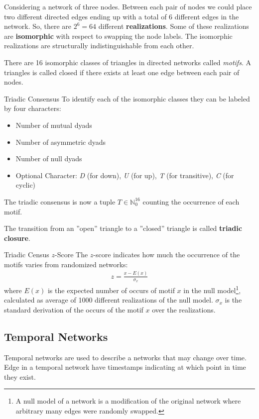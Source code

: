 \documentclass[english]{panikzettel}
\begin{document}
Considering a network of three nodes.
Between each pair of nodes we could place two different directed edges ending up with a total of 6 different edges in the network.
So, there are $ 2^6 = 64 $ different \textbf{realizations}.
Some of these realizations are \textbf{isomorphic} with respect to swapping the node labels.
The isomorphic realizations are structurally indistinguishable from each other.

There are 16 isomorphic classes of triangles in directed networks called \textit{motifs}.
A triangles is called closed if there exists at least one edge between each pair of nodes.

\begin{defi}{Triadic Consensus}
To identify each of the isomorphic classes they can be labeled by four characters:
\begin{itemize}
	\item Number of mutual dyads
	\item Number of asymmetric dyads
	\item Number of null dyads
	\item Optional Character: \textit{D} (for down), \textit{U} (for up), \textit{T} (for transitive), \textit{C} (for cyclic)
\end{itemize}
The triadic consensus is now a tuple $ T \in \mathbb{N}_0^{16} $ counting the occurrence of each motif.
\end{defi}

The transition from an ''open'' triangle to a ''closed'' triangle is called \textbf{triadic closure}.

\begin{defi}{Triadic Census $ z $-Score}
The $ z $-score indicates how much the occurrence of the motifs varies from randomized networks:
\begin{align*}
	z = \frac{x - E(x)}{\sigma_x}
\end{align*}
where $ E(x) $ is the expected number of occurs of motif $ x $ in the null model\footnote{A null model of a network is a modification of the original network where arbitrary many edges were randomly swapped.}, calculated as average of 1000 different realizations of the null model.
$ \sigma_x $ is the standard derivation of the occurs of the motif $ x $ over the realizations.
\end{defi}

\subsection{Temporal Networks}
Temporal networks are used to describe a networks that may change over time.
Edge in a temporal network have timestamps indicating at which point in time they exist.
\end{document}
